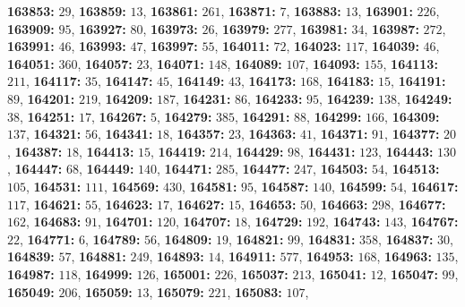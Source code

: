 \textsf{\bfseries 163853:} $29$, \textsf{\bfseries 163859:} $13$, \textsf{\bfseries 163861:} $261$, \textsf{\bfseries 163871:} $7$, \textsf{\bfseries 163883:} $13$, \textsf{\bfseries 163901:} $226$, \textsf{\bfseries 163909:} $95$, \textsf{\bfseries 163927:} $80$, \textsf{\bfseries 163973:} $26$, \textsf{\bfseries 163979:} $277$, \textsf{\bfseries 163981:} $34$, \textsf{\bfseries 163987:} $272$, \textsf{\bfseries 163991:} $46$, \textsf{\bfseries 163993:} $47$, \textsf{\bfseries 163997:} $55$, \textsf{\bfseries 164011:} $72$, \textsf{\bfseries 164023:} $117$, \textsf{\bfseries 164039:} $46$, \textsf{\bfseries 164051:} $360$, \textsf{\bfseries 164057:} $23$, \textsf{\bfseries 164071:} $148$, \textsf{\bfseries 164089:} $107$, \textsf{\bfseries 164093:} $155$, \textsf{\bfseries 164113:} $211$, \textsf{\bfseries 164117:} $35$, \textsf{\bfseries 164147:} $45$, \textsf{\bfseries 164149:} $43$, \textsf{\bfseries 164173:} $168$, \textsf{\bfseries 164183:} $15$, \textsf{\bfseries 164191:} $89$, \textsf{\bfseries 164201:} $219$, \textsf{\bfseries 164209:} $187$, \textsf{\bfseries 164231:} $86$, \textsf{\bfseries 164233:} $95$, \textsf{\bfseries 164239:} $138$, \textsf{\bfseries 164249:} $38$, \textsf{\bfseries 164251:} $17$, \textsf{\bfseries 164267:} $5$, \textsf{\bfseries 164279:} $385$, \textsf{\bfseries 164291:} $88$, \textsf{\bfseries 164299:} $166$, \textsf{\bfseries 164309:} $137$, \textsf{\bfseries 164321:} $56$, \textsf{\bfseries 164341:} $18$, \textsf{\bfseries 164357:} $23$, \textsf{\bfseries 164363:} $41$, \textsf{\bfseries 164371:} $91$, \textsf{\bfseries 164377:} $20$, \textsf{\bfseries 164387:} $18$, \textsf{\bfseries 164413:} $15$, \textsf{\bfseries 164419:} $214$, \textsf{\bfseries 164429:} $98$, \textsf{\bfseries 164431:} $123$, \textsf{\bfseries 164443:} $130$, \textsf{\bfseries 164447:} $68$, \textsf{\bfseries 164449:} $140$, \textsf{\bfseries 164471:} $285$, \textsf{\bfseries 164477:} $247$, \textsf{\bfseries 164503:} $54$, \textsf{\bfseries 164513:} $105$, \textsf{\bfseries 164531:} $111$, \textsf{\bfseries 164569:} $430$, \textsf{\bfseries 164581:} $95$, \textsf{\bfseries 164587:} $140$, \textsf{\bfseries 164599:} $54$, \textsf{\bfseries 164617:} $117$, \textsf{\bfseries 164621:} $55$, \textsf{\bfseries 164623:} $17$, \textsf{\bfseries 164627:} $15$, \textsf{\bfseries 164653:} $50$, \textsf{\bfseries 164663:} $298$, \textsf{\bfseries 164677:} $162$, \textsf{\bfseries 164683:} $91$, \textsf{\bfseries 164701:} $120$, \textsf{\bfseries 164707:} $18$, \textsf{\bfseries 164729:} $192$, \textsf{\bfseries 164743:} $143$, \textsf{\bfseries 164767:} $22$, \textsf{\bfseries 164771:} $6$, \textsf{\bfseries 164789:} $56$, \textsf{\bfseries 164809:} $19$, \textsf{\bfseries 164821:} $99$, \textsf{\bfseries 164831:} $358$, \textsf{\bfseries 164837:} $30$, \textsf{\bfseries 164839:} $57$, \textsf{\bfseries 164881:} $249$, \textsf{\bfseries 164893:} $14$, \textsf{\bfseries 164911:} $577$, \textsf{\bfseries 164953:} $168$, \textsf{\bfseries 164963:} $135$, \textsf{\bfseries 164987:} $118$, \textsf{\bfseries 164999:} $126$, \textsf{\bfseries 165001:} $226$, \textsf{\bfseries 165037:} $213$, \textsf{\bfseries 165041:} $12$, \textsf{\bfseries 165047:} $99$, \textsf{\bfseries 165049:} $206$, \textsf{\bfseries 165059:} $13$, \textsf{\bfseries 165079:} $221$, \textsf{\bfseries 165083:} $107$, 

